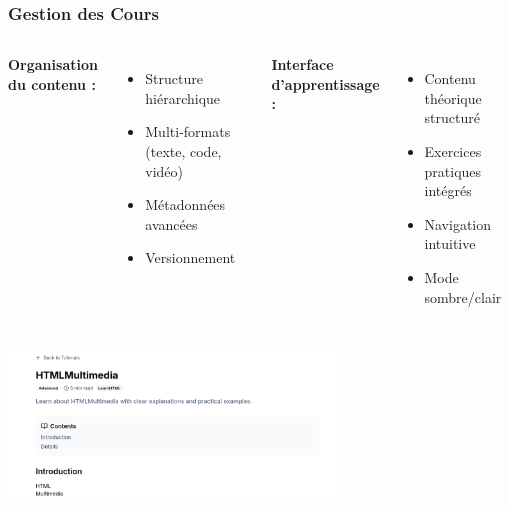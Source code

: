 \documentclass{beamer}
\begin{document}
\begin{frame}
\frametitle{Gestion des Cours}
\begin{columns}
\textbf{Organisation du contenu :}
\begin{itemize}
    \item Structure hiérarchique
    \item Multi-formats (texte, code, vidéo)
    \item Métadonnées avancées
    \item Versionnement
\end{itemize}

\textbf{Interface d'apprentissage :}
\begin{itemize}
    \item Contenu théorique structuré
    \item Exercices pratiques intégrés
    \item Navigation intuitive
    \item Mode sombre/clair
\end{itemize}
\end{columns}

\vspace{0.3cm}
\begin{center}
    \includegraphics[width=0.65\textwidth,height=4cm,keepaspectratio]{week_3_img/part1.png}
\end{center}
\end{frame}
\end{document}
